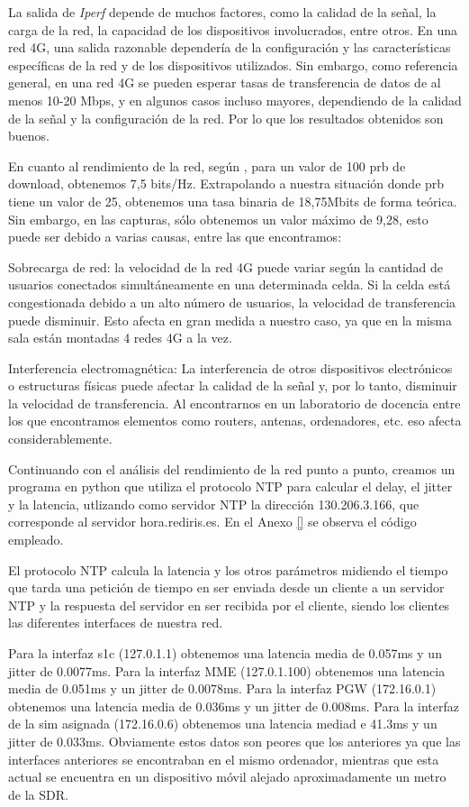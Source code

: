 La salida de \textit{Iperf} depende de muchos factores, como la calidad de la señal, la carga de la red, la capacidad de los dispositivos involucrados, entre otros.
En una red 4G, una salida razonable dependería de la configuración y las características específicas de la red y de los dispositivos utilizados. Sin embargo, como referencia general, en una red 4G se pueden esperar tasas de transferencia de datos de al menos 10-20 Mbps, y en algunos casos incluso mayores, dependiendo de la calidad de la señal y la configuración de la red. Por lo que los resultados obtenidos son buenos. 

En cuanto al rendimiento de la red, según \cite{Rendimiento}, para un valor de 100 prb de download, obtenemos 7,5 bits/Hz. Extrapolando a nuestra situación donde prb tiene un valor de 25, obtenemos una tasa binaria de 18,75Mbits de forma teórica. Sin embargo, en las capturas, sólo obtenemos un valor máximo de 9,28, esto puede ser debido a varias causas, entre las que encontramos: 

Sobrecarga de red: la velocidad de la red 4G puede variar según la cantidad de usuarios conectados simultáneamente en una determinada celda. Si la celda está congestionada debido a un alto número de usuarios, la velocidad de transferencia puede disminuir. Esto afecta en gran medida a  nuestro caso, ya que en la misma sala están montadas 4 redes 4G a la vez. 

Interferencia electromagnética: La interferencia de otros dispositivos electrónicos o estructuras físicas puede afectar la calidad de la señal y, por lo tanto, disminuir la velocidad de transferencia. Al encontrarnos en un laboratorio de docencia entre los que encontramos elementos como routers, antenas, ordenadores, etc. eso afecta considerablemente.

Continuando con el análisis del rendimiento de la red punto a punto, creamos un programa en python que utiliza el protocolo NTP para calcular el delay, el jitter y la latencia, utlizando como servidor NTP la dirección 130.206.3.166, que corresponde al servidor hora.rediris.es. En el Anexo \ref{} se observa el código empleado.

El protocolo NTP calcula la latencia y los otros parámetros midiendo el tiempo que tarda una petición de tiempo en ser enviada desde un cliente a un servidor NTP y la respuesta del servidor en ser recibida por el cliente, siendo los clientes las diferentes interfaces de nuestra red.

Para la interfaz s1c (127.0.1.1) obtenemos una latencia media de 0.057ms y un jitter de 0.0077ms.
Para la interfaz MME (127.0.1.100) obtenemos una latencia media de 0.051ms y un jitter de 0.0078ms.
Para la interfaz PGW (172.16.0.1) obtenemos una latencia media de 0.036ms y un jitter de 0.008ms.
Para la interfaz de la sim asignada (172.16.0.6) obtenemos una latencia mediad e 41.3ms y un jitter de 0.033ms. Obviamente estos datos son peores que los anteriores ya que las interfaces anteriores se encontraban en el mismo ordenador, mientras que esta actual se encuentra en un dispositivo móvil alejado aproximadamente un metro de la SDR.

